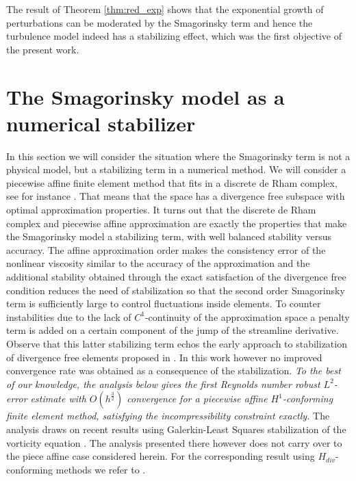 \documentclass[10pt]{amsart}
\numberwithin{equation}{section}
\theoremstyle{definition}
\theoremstyle{remark}
\renewcommand{\(}{\bigl(}
\renewcommand{\)}{\bigr)}
\begin{document}
The result of Theorem
\ref{thm:red_exp}
shows that the exponential growth of perturbations can be moderated by
the Smagorinsky term and hence the turbulence model indeed has a
stabilizing effect, which was the first objective of the present work.
\section{The Smagorinsky model as a numerical stabilizer}
In this section we will consider the situation where the
Smagorinsky term is not a physical model, but a stabilizing term in a
numerical method. We will consider a piecewise affine finite
element method that fits in a discrete de Rham
complex, see for instance \cite{Zhang08, GN18, CH18}. That means that the space has a divergence free subspace with
optimal approximation properties. It turns out that the
discrete de Rham complex and piecewise affine approximation are
exactly the properties that make the
Smagorinsky model a stabilizing term, with well balanced stability
versus accuracy. The affine approximation order makes the
consistency error of the nonlinear viscosity similar to the accuracy
of the approximation and the additional stability obtained through the
exact satisfaction of the divergence free condition reduces the need
of stabilization so that the second order Smagorinsky term is
sufficiently large to control fluctuations inside elements. To counter
instabilities due to the lack of $C^1$-continuity of the
approximation space a penalty term is added on a certain component of
the jump of the streamline derivative. Observe that this latter
stabilizing term echos the early approach to stabilization of
divergence free elements proposed in \cite{BL08}. In this work however no
improved convergence rate was obtained as a consequence of the
stabilization. \emph{To the best of our knowledge, the analysis below gives the first Reynolds number
robust $L^2$-error estimate with $O(h^{\frac32})$ convergence for a
piecewise affine $H^1$-conforming finite element method, satisfying the
incompressibility constraint exactly.} The analysis draws on recent
results using Galerkin-Least Squares
stabilization of the vorticity equation \cite{ABBGLM20}. The analysis
presented there however does not carry over to the piece affine case
considered herein. For the corresponding result
using $H_{div}$-conforming methods
we refer to \cite{BBG20}.
\end{document}
